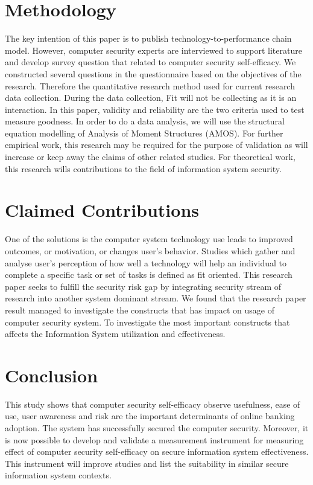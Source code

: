 \documentclass[a4paper, 12pt]{article}
\begin{document}
\section{Methodology}

The key intention of this paper is to publish technology-to-performance chain model. However, computer security experts are interviewed to support literature and develop survey question that related to computer security self-efficacy. We constructed several questions in the questionnaire based on the objectives of the research. Therefore the quantitative research method used for current research data collection. During the data collection, Fit will not be collecting as it is an interaction. In this paper, validity and reliability are the two criteria used to test measure goodness. In order to do a data analysis, we will use the structural equation modelling of Analysis of Moment Structures (AMOS).
For further empirical work, this research may be required for the purpose of validation as will increase or keep away the claims of other related studies. For theoretical work, this research wills contributions to the field of information system security.

\section{Claimed Contributions}

One of the solutions is the computer system technology use leads to improved outcomes, or motivation, or changes user’s behavior. Studies which gather and analyse user’s perception of how well a technology will help an individual to complete a specific task or set of tasks is defined as fit oriented. This research paper seeks to fulfill the security risk gap by integrating security stream of research into another system dominant stream. We found that the research paper result managed to investigate the constructs that has impact on usage of computer security system. To investigate the most important constructs that affects the Information System utilization and effectiveness.

\section{Conclusion}

This study shows that computer security self-efficacy observe usefulness, ease of use, user awareness and risk are the important determinants of online banking adoption. The system has successfully secured the computer security. Moreover, it is now possible to develop and validate a measurement instrument for measuring effect of computer security self-efficacy on secure information system effectiveness. This instrument will improve studies and list the suitability in similar secure information system contexts. 
\end{document}
